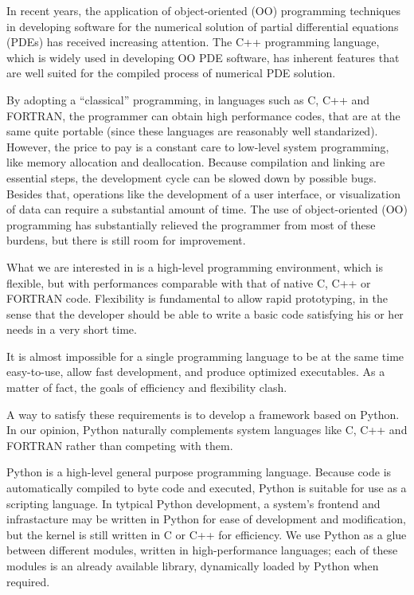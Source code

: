 \documentclass[10pt,relax]{SANDreport}
\begin{document}
In recent years, the application of object-oriented (OO) programming
techniques in developing software for the numerical solution of partial
differential equations (PDEs) has received increasing attention. The C++
programming language, which is widely used in developing OO PDE software, has
inherent features that are well suited for the compiled process of numerical
PDE solution.

By adopting a ``classical'' programming, in languages such as C, C++ and
FORTRAN, the programmer can  obtain high performance codes, that are at the
same quite portable (since these languages are reasonably well standarized).
However, the price to pay is a constant care to low-level system programming,
  like memory allocation and deallocation. Because compilation and linking are
  essential steps, the development cycle can be slowed down by possible bugs.
  Besides that, operations like the development of a user interface, or
  visualization of data can require a substantial amount of time. The use of
  object-oriented (OO) programming has substantially relieved the programmer
  from most of these burdens, but there is still room for improvement.

What we are interested in is a high-level programming environment, which is
flexible, but with performances comparable with that of native C, C++ or
FORTRAN code. Flexibility is fundamental to allow rapid prototyping, in the
sense that the developer should be able to write a basic code satisfying his
or her needs in a very short time. 

It is almost impossible for a single
programming language to be at the same time easy-to-use, allow fast
development, and produce optimized executables. As a matter of fact, the
goals of efficiency and flexibility clash. 

A way to satisfy these requirements is to develop a framework based on Python.
In our opinion, Python naturally complements system
languages like C, C++ and FORTRAN rather than competing with them.

Python is a high-level general purpose programming language. Because code is
automatically compiled to byte code and executed, Python is suitable for use
as a scripting language.  In tytpical Python development, a system's frontend
and infrastacture may be written in Python for ease of development and
modification, but the kernel is still written in C or C++ for efficiency.  We
use Python as a glue between different modules, written in high-performance
languages; each of these modules is an already available library, dynamically
loaded by Python when required.
\end{document}
